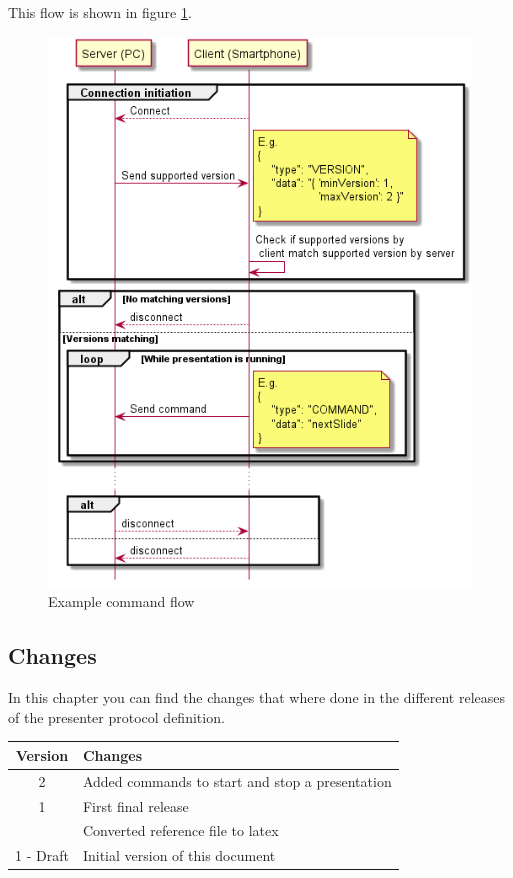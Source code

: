 \documentclass{article}
\begin{document}
This flow is shown in figure \ref{command_flow}.

\begin{figure}
\centering
\includegraphics{./diagrams/gen/CommandFlow.png}
\caption{Example command flow}
\label{command_flow}
\end{figure}

\printbibliography[heading=subbibliography]

\newpage

\subsection{Changes}

In this chapter you can find the changes that where done in the different releases of the presenter protocol definition.

\begin{longtable}{cl}
\toprule
Version & Changes\tabularnewline
\midrule
\endhead
2 & Added commands to start and stop a presentation\\
1 & First final release \\
  & Converted reference file to latex\\
1 - Draft & Initial version of this document\\
\bottomrule
\end{longtable}
\end{document}

